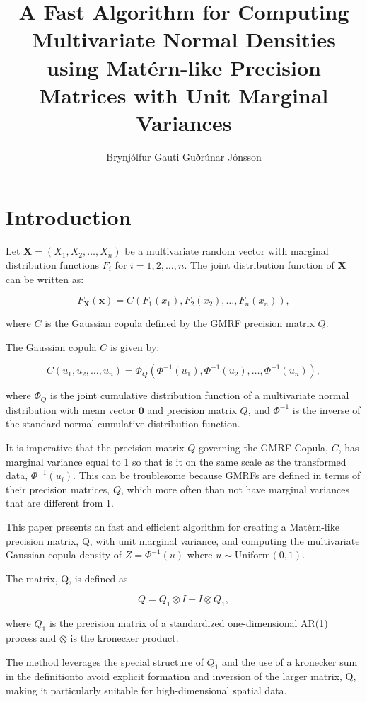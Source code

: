 \documentclass[journal=,manuscript=]{achemso}
\author{Brynjólfur Gauti Guðrúnar Jónsson}
\affiliation{ University of Iceland,  }
\title[]{A Fast Algorithm for Computing Multivariate Normal Densities
using Matérn-like Precision Matrices with Unit Marginal Variances}
\begin{document}
\maketitle


\section{Introduction}\label{introduction}

Let \(\mathbf{X} = (X_1, X_2, \ldots, X_n)\) be a multivariate random
vector with marginal distribution functions \(F_i\) for
\(i = 1, 2, \ldots, n\). The joint distribution function of
\(\mathbf{X}\) can be written as:

\[
F_{\mathbf{X}}(\mathbf{x}) = C(F_1(x_1), F_2(x_2), \ldots, F_n(x_n)),
\]

where \(C\) is the Gaussian copula defined by the GMRF precision matrix
\(Q\).

The Gaussian copula \(C\) is given by:

\[
C(u_1, u_2, \ldots, u_n) = \Phi_Q(\Phi^{-1}(u_1), \Phi^{-1}(u_2), \ldots, \Phi^{-1}(u_n)),
\]

where \(\Phi_Q\) is the joint cumulative distribution function of a
multivariate normal distribution with mean vector \(\mathbf{0}\) and
precision matrix \(Q\), and \(\Phi^{-1}\) is the inverse of the standard
normal cumulative distribution function.

It is imperative that the precision matrix \(Q\) governing the GMRF
Copula, \(C\), has marginal variance equal to 1 so that is it on the
same scale as the transformed data, \(\Phi^{-1}(u_i)\). This can be
troublesome because GMRFs are defined in terms of their precision
matrices, \(Q\), which more often than not have marginal variances that
are different from 1.

This paper presents an fast and efficient algorithm for creating a
Matérn-like precision matrix, Q, with unit marginal variance, and
computing the multivariate Gaussian copula density of
\(Z = \Phi^{-1}(u)\) where \(u \sim \mathrm{Uniform}(0, 1)\).

The matrix, Q, is defined as

\[
Q = Q_1 \otimes I + I \otimes Q_1,
\]

where \(Q_1\) is the precision matrix of a standardized one-dimensional
AR(1) process and \(\otimes\) is the kronecker product.

The method leverages the special structure of \(Q_1\) and the use of a
kronecker sum in the definitionto avoid explicit formation and inversion
of the larger matrix, Q, making it particularly suitable for
high-dimensional spatial data.
\end{document}

